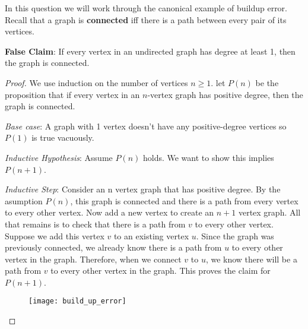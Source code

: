In this question we will work through the canonical example of buildup error. Recall that a graph is \textbf{connected} iff there is a path between every pair of its vertices. \newline

\textbf{False Claim}: If every vertex in an undirected graph has degree 
at least 1, then the graph is connected.\newline

\begin{proof} We use induction on the number of vertices $n \geq 1$. let $P(n)$ be the proposition that if every vertex in an $n$-vertex graph has positive degree, then the graph is connected. \newline

\textit{Base case}: A graph with 1 vertex doesn't have any positive-degree vertices so $P(1)$ is true vacuously.\newline

\textit{Inductive Hypothesis}: Assume $P(n)$ holds. We want to show this implies $P(n+1)$.\newline

\textit{Inductive Step}: Consider an n vertex graph that has positive degree. By the asumption $P(n)$, this graph is connected and there is a path from every vertex to every other vertex. Now add a new vertex to create an $n+1$ vertex graph. All that remains is to check that there is a path from $v$ to every other vertex. Suppose we add this vertex $v$ to an existing vertex $u$. Since the graph was previously connected, we already know there is a path from $u$ to every other vertex in the graph. Therefore, when we connect $v$ to $u$, we know there will be a path from $v$ to every other vertex in the graph. This proves the claim for $P(n+1)$.

\begin{figure}[h]
\texttt{[image: build\_up\_error]}
\centering
\end{figure}
 
\end{proof}


